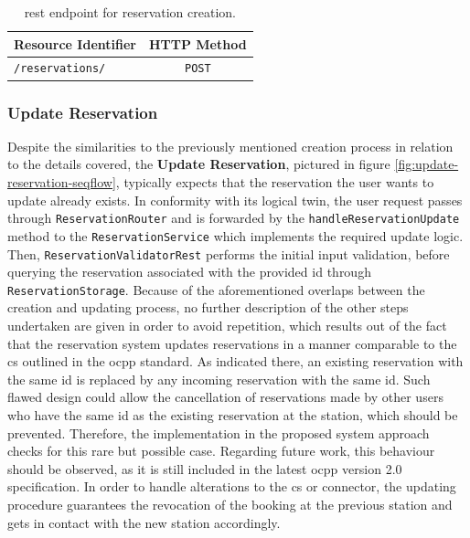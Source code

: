 \begingroup
\setlength{\tabcolsep}{10pt} %
\renewcommand{\arraystretch}{1.5} %
\begin{table}[h]
\centering
\caption{\acrshort{rest} endpoint for reservation creation.}
    \begin{tabular}{l|c}
    Resource Identifier & HTTP Method \\ \hline
    \texttt{/reservations/} & \texttt{POST} \\    
    \end{tabular}
\label{tab:create-reservation-rest}
\end{table}
\endgroup

\newpage

\subsubsection{Update Reservation}
\label{ch:Implementation:sec:Reservation System:ssec:Management Capabilities:sssec:Update Reservation}

Despite the similarities to the previously mentioned creation process in relation to the details covered, the \textbf{Update Reservation}, pictured in figure \ref{fig:update-reservation-seqflow}, typically expects that the reservation the user wants to update already exists.
In conformity with its logical twin, the user request passes through \texttt{ReservationRouter} and is forwarded by the \texttt{handleReservationUpdate} method to the \texttt{ReservationService} which implements the required update logic.
Then, \texttt{ReservationValidatorRest} performs the initial input validation, before querying the reservation associated with the provided \acrshort{id} through \\ \texttt{ReservationStorage}.
Because of the aforementioned overlaps between the creation and updating process, no further description of the other steps undertaken are given in order to avoid repetition, which results out of the fact that the reservation system updates reservations in a manner comparable to the \acrshort{cs} outlined in the \acrshort{ocpp} standard.
As indicated there, an existing reservation with the same \acrshort{id} is replaced by any incoming reservation with the same \acrshort{id}.  
Such flawed design could allow the cancellation of reservations made by other users who have the same \acrshort{id} as the existing reservation at the station, which should be prevented.  Therefore, the implementation in the proposed system approach checks for this rare but possible case.
Regarding future work, this behaviour should be observed, as it is still included in the latest \acrshort{ocpp} version 2.0 specification.
In order to handle alterations to the \acrshort{cs} or connector, the updating procedure guarantees the revocation of the booking at the previous station and gets in contact with the new station accordingly.

